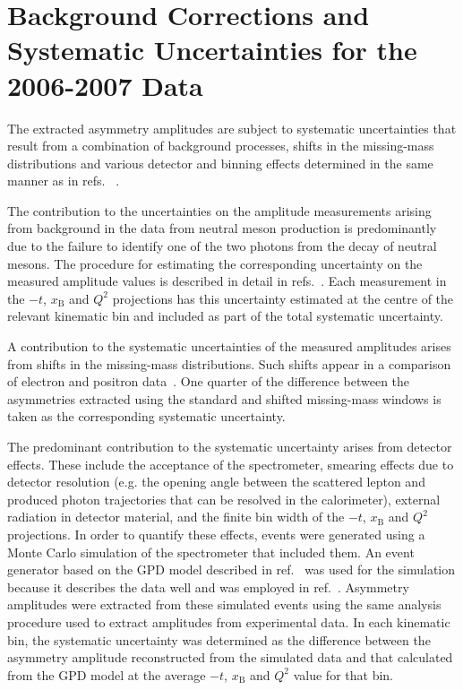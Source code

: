 \section{Background Corrections and Systematic Uncertainties for the
  2006-2007 Data}
The extracted asymmetry amplitudes are subject to systematic uncertainties  that result from a combination of background processes, shifts in the missing-mass distributions\red{,} and various detector and binning effects determined in the same manner as  in refs.~\cite{Air08,Air09} .

The contribution to the uncertainties on the amplitude measurements
arising from background in the data from neutral meson
production is predominantly due to the failure to identify one of
  the two photons from the decay of  neutral mesons. The procedure for estimating the corresponding
uncertainty on the measured amplitude values is described in detail in
refs.~\cite{Air08,Air09}. Each measurement in the $-t$, $x_{\textrm{B}}$ and
  $Q^{2}$ projections has this uncertainty estimated at the
  centre of the relevant kinematic bin and included as part of the
  total systematic uncertainty.

A contribution to the systematic uncertainties of the
  measured amplitudes arises from shifts in  the
missing-mass distributions. Such shifts appear in a comparison of electron and positron data~\cite{Zei09,Bur10}. One
quarter of the difference between the asymmetries extracted using the standard
and shifted missing-mass windows is taken as the corresponding systematic
uncertainty. 

The predominant contribution to the systematic uncertainty arises from detector
effects. These include the acceptance of the spectrometer, smearing
effects due to detector resolution (e.g. the  opening angle between the scattered lepton and produced photon trajectories that can be resolved in the calorimeter), external radiation in detector material,  and the finite bin width of the $-t$, $x_{\textrm{B}}$ and $Q^{2}$ projections. In order to quantify these effects, events were generated using a Monte Carlo simulation of the spectrometer that included them. An event generator based on the GPD model described in ref.~\cite{Guz06} was used for the simulation because it describes the data well and was employed in ref.~\cite{Air09}. Asymmetry amplitudes were extracted from these simulated events using the same analysis procedure used to
extract amplitudes from experimental data. In each kinematic bin, the
systematic uncertainty was determined as the difference between the asymmetry amplitude reconstructed from the simulated data and that
calculated from the GPD model at the average $-t$, $x_{\textrm{B}}$ and
$Q^{2}$ value for that bin.

